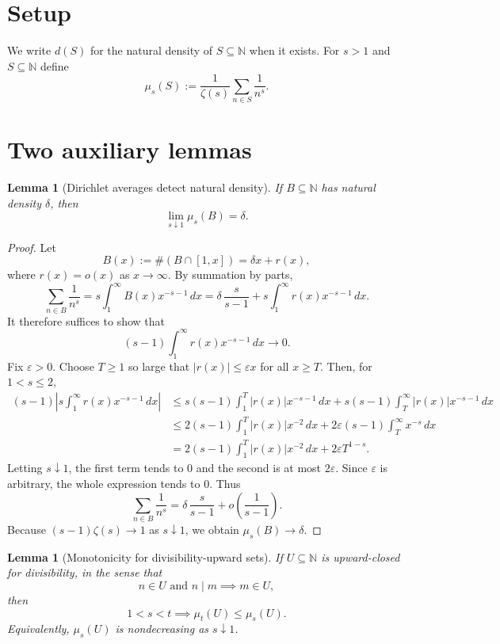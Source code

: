 \documentclass[11pt]{article}
\newtheorem{lemma}[theorem]{Lemma}
\theoremstyle{definition}
\theoremstyle{remark}
\newcommand{\N}{\mathbb N}
\begin{document}
\section{Setup}

We write \(d(S)\) for the natural density of \(S\subseteq\N\) when it exists.
For \(s>1\) and \(S\subseteq\N\) define
\[
\mu_s(S):=\frac1{\zeta(s)}\sum_{n\in S}\frac1{n^s}.
\]

\section{Two auxiliary lemmas}

\begin{lemma}[Dirichlet averages detect natural density]\label{lem:density-to-Dirichlet}
If \(B\subseteq\N\) has natural density \(\delta\), then
\[
\lim_{s\downarrow 1}\mu_s(B)=\delta.
\]
\end{lemma}

\begin{proof}
Let
\[
B(x):=\#(B\cap[1,x])=\delta x+r(x),
\]
where \(r(x)=o(x)\) as \(x\to\infty\).
By summation by parts,
\[
\sum_{n\in B}\frac1{n^s}
=s\int_1^\infty B(x)x^{-s-1}\,dx
=\delta\,\frac{s}{s-1}+s\int_1^\infty r(x)x^{-s-1}\,dx.
\]
It therefore suffices to show that
\[
(s-1)\int_1^\infty r(x)x^{-s-1}\,dx\to 0.
\]
Fix \(\varepsilon>0\).
Choose \(T\ge 1\) so large that \(|r(x)|\le \varepsilon x\) for all \(x\ge T\).
Then, for \(1<s\le 2\),
\[
\begin{aligned}
(s-1)\left|s\int_1^\infty r(x)x^{-s-1}\,dx\right|
&\le s(s-1)\int_1^T |r(x)|x^{-s-1}\,dx
   +s(s-1)\int_T^\infty |r(x)|x^{-s-1}\,dx \\
&\le 2(s-1)\int_1^T |r(x)|x^{-2}\,dx
   +2\varepsilon (s-1)\int_T^\infty x^{-s}\,dx \\
&= 2(s-1)\int_1^T |r(x)|x^{-2}\,dx + 2\varepsilon T^{1-s}.
\end{aligned}
\]
Letting \(s\downarrow 1\), the first term tends to \(0\) and the second is at most \(2\varepsilon\).
Since \(\varepsilon\) is arbitrary, the whole expression tends to \(0\).
Thus
\[
\sum_{n\in B}\frac1{n^s}
=\delta\,\frac{s}{s-1}+o\!\left(\frac1{s-1}\right).
\]
Because \((s-1)\zeta(s)\to 1\) as \(s\downarrow 1\), we obtain \(\mu_s(B)\to \delta\).
\end{proof}

\begin{lemma}[Monotonicity for divisibility-upward sets]\label{lem:divisibility-monotone}
If \(U\subseteq\N\) is upward-closed for divisibility, in the sense that
\[
n\in U \text{ and } n\mid m \implies m\in U,
\]
then
\[
1<s<t \implies \mu_t(U)\le \mu_s(U).
\]
Equivalently, \(\mu_s(U)\) is nondecreasing as \(s\downarrow 1\).
\end{lemma}
\end{document}
